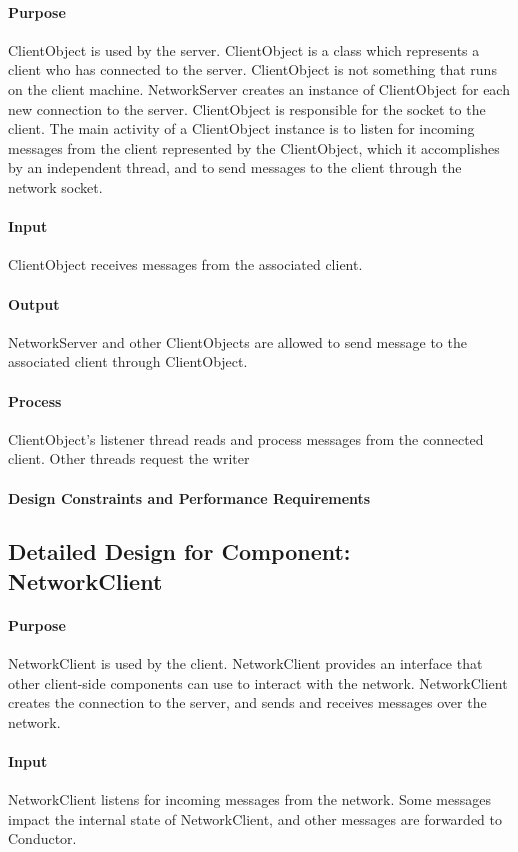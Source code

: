 \documentclass[12pt,a4paper]{article}
\begin{document}
\paragraph{Purpose} ClientObject is used by the server. ClientObject is a class which represents a client who has connected to the server. ClientObject is not something that runs on the client machine. NetworkServer creates an instance of ClientObject for each new connection to the server. ClientObject is responsible for the socket to the client. The main activity of a ClientObject instance is to listen for incoming messages from the client represented by the ClientObject, which it accomplishes by an independent thread, and to send messages to the client through the network socket.
\paragraph{Input} ClientObject receives messages from the associated client. 
\paragraph{Output} NetworkServer and other ClientObjects are allowed
to send message to the associated client through ClientObject.
\paragraph{Process} ClientObject's listener thread reads and process messages from the connected client. Other threads request the writer
\paragraph{Design Constraints and Performance Requirements}

\subsection{Detailed Design for Component: NetworkClient }
\paragraph{Purpose} NetworkClient is used by the client. NetworkClient provides an interface that other client-side components can use to interact with the network. NetworkClient creates the connection to the server, and sends and receives messages over the network.
\paragraph{Input} NetworkClient listens for incoming messages from the network. Some messages impact the internal state of NetworkClient, and other messages are forwarded to Conductor.
\end{document}
